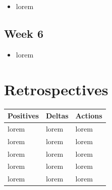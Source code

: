 \documentclass[10pt, onecolumn, draftclsnofoot, letterpaper, compsoc]{IEEEtran}
\begin{document}
    \begin{itemize}

    \item lorem

    \end{itemize}

\subsection{Week 6}

    \begin{itemize}

    \item lorem

    \end{itemize}

\section{Retrospectives}

\begin{table}[h]
    \centering
    \begin{tabular}{|p{.3\linewidth}|p{.3\linewidth}|p{.3\linewidth}|}

    \cline{3-3}

    \hline \textbf{Positives} & \textbf{Deltas} & \textbf{Actions} \\ \hline

    lorem & lorem & lorem \\ \hline
    lorem & lorem & lorem \\ \hline
    lorem & lorem & lorem \\ \hline
    lorem & lorem & lorem \\ \hline
    lorem & lorem & lorem \\ \hline

    \end{tabular}
\end{table}
\end{document}

